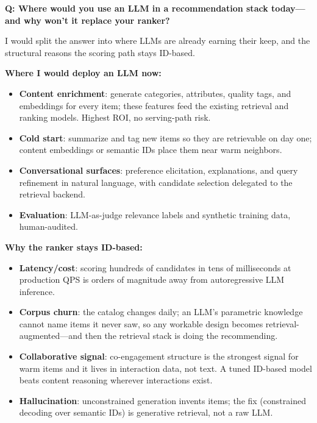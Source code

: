\begin{interviewq}
\textbf{Q: Where would you use an LLM in a recommendation stack today---and why won't it replace your ranker?}

 \quad {} \quad \badgefreq{\freqhigh}

\stronganswer

I would split the answer into where LLMs are already earning their keep, and the structural reasons the scoring path stays ID-based.

\textbf{Where I would deploy an LLM now:}
\begin{itemize}
    \item \textbf{Content enrichment}: generate categories, attributes, quality tags, and embeddings for every item; these features feed the existing retrieval and ranking models. Highest ROI, no serving-path risk.
    \item \textbf{Cold start}: summarize and tag new items so they are retrievable on day one; content embeddings or semantic IDs place them near warm neighbors.
    \item \textbf{Conversational surfaces}: preference elicitation, explanations, and query refinement in natural language, with candidate selection delegated to the retrieval backend.
    \item \textbf{Evaluation}: LLM-as-judge relevance labels and synthetic training data, human-audited.
\end{itemize}

\textbf{Why the ranker stays ID-based:}
\begin{itemize}
    \item \textbf{Latency/cost}: scoring hundreds of candidates in tens of milliseconds at production QPS is orders of magnitude away from autoregressive LLM inference.
    \item \textbf{Corpus churn}: the catalog changes daily; an LLM's parametric knowledge cannot name items it never saw, so any workable design becomes retrieval-augmented---and then the retrieval stack is doing the recommending.
    \item \textbf{Collaborative signal}: co-engagement structure is the strongest signal for warm items and it lives in interaction data, not text. A tuned ID-based model beats content reasoning wherever interactions exist.
    \item \textbf{Hallucination}: unconstrained generation invents items; the fix (constrained decoding over semantic IDs) is generative retrieval, not a raw LLM.
\end{itemize}


\end{interviewq}
